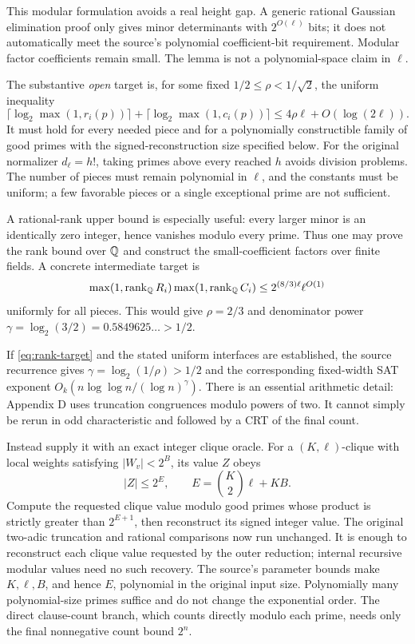This modular formulation avoids a real height gap. A generic rational
Gaussian elimination proof only gives minor determinants with
$2^{O(\ell)}$ bits; it does not automatically meet the source's
polynomial coefficient-bit requirement. Modular factor coefficients
remain small. The lemma is not a polynomial-space claim in $\ell$.

The substantive \emph{open} target is, for some fixed
$1/2\le\rho<1/\sqrt2$, the uniform inequality
\begin{equation}\label{eq:rank-target}
 \lceil\log_2\max(1,r_i(p))\rceil+
 \lceil\log_2\max(1,c_i(p))\rceil
 \le4\rho\ell+O(\log(2\ell)).
\end{equation}
It must hold for every needed piece and for a polynomially constructible
family of good primes with the signed-reconstruction size specified below. For the original
normalizer $d_\ell=h!$, taking primes above every reached $h$ avoids
division problems. The number of pieces must remain polynomial in
$\ell$, and the constants must be uniform; a few favorable pieces or a
single exceptional prime are not sufficient.

A rational-rank upper bound is especially useful: every larger minor is
an identically zero integer, hence vanishes modulo every prime. Thus one
may prove the rank bound over $\mathbb Q$ and construct the small-coefficient
factors over finite fields. A concrete intermediate target is
\[
 \max(1,\operatorname{rank}_{\mathbb Q}R_i)
 \max(1,\operatorname{rank}_{\mathbb Q}C_i)
 \le 2^{(8/3)\ell}\ell^{O(1)}
\]
uniformly for all pieces. This would give $\rho=2/3$ and denominator
power $\gamma=\log_2(3/2)=0.5849625\ldots>1/2$.

If \eqref{eq:rank-target} and the stated uniform interfaces are
established, the source recurrence gives
$\gamma=\log_2(1/\rho)>1/2$ and the corresponding fixed-width SAT
exponent $O_k(n\log\log n/(\log n)^\gamma)$.
There is an essential arithmetic detail: Appendix D uses truncation
congruences modulo powers of two. It cannot simply be rerun in odd
characteristic and followed by a CRT of the final count.

Instead supply it with an exact integer clique oracle. For a
$(K,\ell)$-clique with local weights satisfying $|W_v|<2^B$, its value
$Z$ obeys
\[
 |Z|\le 2^E,\qquad E=\binom K2\ell+KB.
\]
Compute the requested clique value modulo good primes whose product is
strictly greater than $2^{E+1}$, then reconstruct its signed integer value.
The original two-adic truncation and rational comparisons now run
unchanged. It is enough to reconstruct each clique value requested by the
outer reduction; internal recursive modular values need no such recovery.
The source's parameter bounds make $K,\ell,B$, and hence $E$, polynomial
in the original input size. Polynomially many polynomial-size primes
suffice and do not change the exponential order. The direct clause-count
branch, which counts directly modulo each prime, needs only the final
nonnegative count bound $2^n$.

